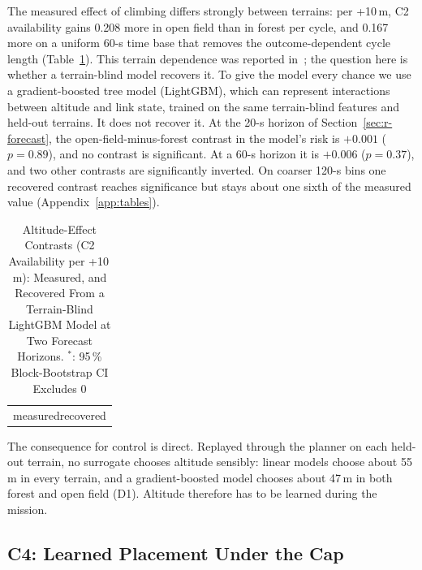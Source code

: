 The measured effect of climbing differs strongly between terrains: per +10\,m,
C2 availability gains 0.208 more in open field than in forest per cycle, and
0.167 more on a uniform 60-s time base that removes the outcome-dependent cycle
length (Table~\ref{tab:contrasts}). This terrain dependence was reported
in~\cite{makhubela2026satnac}; the question here is whether a terrain-blind
model recovers it. To give the model every chance we use a gradient-boosted
tree model (LightGBM), which can represent interactions between altitude and
link state, trained on the same terrain-blind features and held-out terrains.
It does not recover it. At the 20-s horizon of Section~\ref{sec:r-forecast}, the
open-field-minus-forest contrast in the model's risk is $+0.001$ ($p = 0.89$),
and no contrast is significant. At a 60-s horizon it is $+0.006$ ($p = 0.37$),
and two other contrasts are significantly inverted. On coarser 120-s bins one
recovered contrast reaches significance but stays about one sixth of the
measured value (Appendix~\ref{app:tables}).

\begin{table}[t]
\caption{Altitude-Effect Contrasts (C2 Availability per +10\,m): Measured,
and Recovered From a Terrain-Blind LightGBM Model at Two Forecast Horizons.
$^*$: 95\,\% Block-Bootstrap CI Excludes 0}
\label{tab:contrasts}
\centering
\small
\begin{tabular}{@{}c@{}}
{\footnotesize \hspace{16mm}measured\hspace{14mm}recovered}\\[-1pt]

\end{tabular}
\end{table}

The consequence for control is direct. Replayed through the planner on each
held-out terrain, no surrogate chooses altitude sensibly: linear models choose
about 55\,m in every terrain, and a gradient-boosted model chooses about 47\,m in both
forest and open field (D1). Altitude therefore has to be learned during the
mission.

\subsection{C4: Learned Placement Under the Cap}
\label{sec:r-place}

